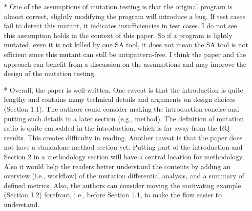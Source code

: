 * One of the assumptions of mutation testing is that the original program is almost correct, slightly modifying the program will introduce a bug. If test cases fail to detect this mutant, it indicates insufficiencies in test cases. I do not see this assumption holds in the context of this paper. So if a program is lightly mutated, even it is not killed by one SA tool, it does not mean the SA tool is not efficient since this mutant can still be antipattern-free. I think the paper and the approach can benefit from a discussion on the assumptions and may improve the design of the mutation testing.

* Overall, the paper is well-written. One caveat is that the introduction is quite lengthy and contains many technical details and arguments on design choices (Section 1.1). The authors could consider making the introduction concise and putting such details in a later section (e.g., method). The definition of mutation ratio is quite embedded in the introduction, which is far away from the RQ results. This creates difficulty in reading. Another caveat is that the paper does not have a standalone method section yet. Putting part of the introduction and Section 2 in a methodology section will have a central location for methodology, Also it would help the readers better understand the contents by adding an overview (i.e., workflow) of the mutation differential analysis, and a summary of defined metrics. Also, the authors can consider moving the motivating example (Section 1.2) forefront, i.e., before Section 1.1, to make the flow easier to understand.